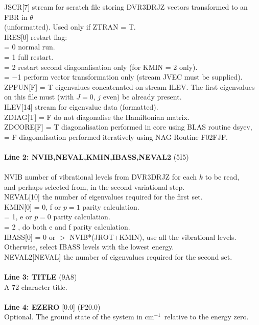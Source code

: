 \documentclass{elsart}
\def\cm{{cm$^{-1}$}}
\begin{document}
\begin{tabbing}
JSCR[7] \> stream for scratch file storing DVR3DRJZ vectors transformed to an
FBR in $\theta$\\ \> (unformatted). Used only if ZTRAN = T.\\
IRES[0] \> restart flag:\\
        \> = 0 normal run.\\
        \> = 1 full restart.\\
        \> = 2 restart second diagonalisation only (for KMIN = 2 only).\\
        \> = $-$1 perform vector transformation only (stream JVEC must be
supplied).\\
ZPFUN[F]\> = T eigenvalues concatenated on stream ILEV. The first
eigenvalues \\ \> on this file must (with $J=0$, $j$ even) be already
present.\\
ILEV[14] \> stream for eigenvalue data (formatted).\\
ZDIAG[T] \> = F do not diagonalise the Hamiltonian matrix.\\
ZDCORE[F]\> = T diagonalisation performed in core using BLAS routine dsyev,\\
         \> = F diagonalisation performed iteratively using NAG Routine
F02FJF.\\
\\
{\bf Line 2: NVIB,NEVAL,KMIN,IBASS,NEVAL2} (5I5)\\
\\
NVIB \> number of vibrational levels from DVR3DRJZ for each $k$ to be
read,\\
\> and perhaps selected from, in the second variational step.\\
NEVAL[10] \> the number of eigenvalues required for the first set.\\
KMIN[0] \> = 0, f or $p = 1$ parity calculation.\\
        \> = 1, e or $p = 0$ parity calculation.\\
        \> = 2 , do both e and f parity calculation.\\
IBASS[0] \> = 0 or $>$ NVIB*(JROT+KMIN), use all the vibrational levels.\\
        \> Otherwise, select IBASS levels with the lowest energy.\\
NEVAL2[NEVAL] the number of eigenvalues required for the second set.\\
\\
{\bf Line 3: TITLE} (9A8)\\
A 72 character title.\\
\\
{\bf Line 4: EZERO} [0.0] (F20.0)\\
Optional. The ground state of the system in \cm\ relative to the energy zero.\\
\end{tabbing}
\end{document}
